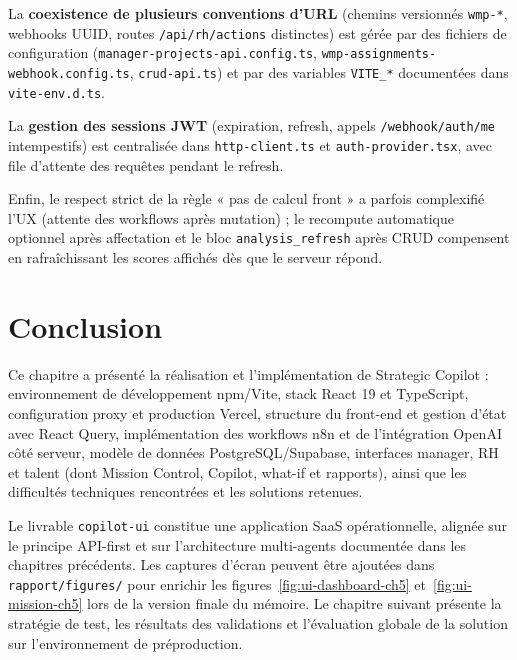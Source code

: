 La \textbf{coexistence de plusieurs conventions d'URL} (chemins versionnés \texttt{wmp-*}, webhooks UUID, routes \texttt{/api/rh/actions} distinctes) est gérée par des fichiers de configuration (\texttt{manager-projects-api.config.ts}, \texttt{wmp-assignments-webhook.config.ts}, \texttt{crud-api.ts}) et par des variables \texttt{VITE\_*} documentées dans \texttt{vite-env.d.ts}.

La \textbf{gestion des sessions JWT} (expiration, refresh, appels \texttt{/webhook/auth/me} intempestifs) est centralisée dans \texttt{http-client.ts} et \texttt{auth-provider.tsx}, avec file d'attente des requêtes pendant le refresh.

Enfin, le respect strict de la règle « pas de calcul front » a parfois complexifié l'UX (attente des workflows après mutation) ; le recompute automatique optionnel après affectation et le bloc \texttt{analysis\_refresh} après CRUD compensent en rafraîchissant les scores affichés dès que le serveur répond.

\section{Conclusion}

Ce chapitre a présenté la réalisation et l'implémentation de Strategic Copilot : environnement de développement npm/Vite, stack React 19 et TypeScript, configuration proxy et production Vercel, structure du front-end et gestion d'état avec React Query, implémentation des workflows n8n et de l'intégration OpenAI côté serveur, modèle de données PostgreSQL/Supabase, interfaces manager, RH et talent (dont Mission Control, Copilot, what-if et rapports), ainsi que les difficultés techniques rencontrées et les solutions retenues.

Le livrable \texttt{copilot-ui} constitue une application SaaS opérationnelle, alignée sur le principe API-first et sur l'architecture multi-agents documentée dans les chapitres précédents. Les captures d'écran peuvent être ajoutées dans \texttt{rapport/figures/} pour enrichir les figures~\ref{fig:ui-dashboard-ch5} et~\ref{fig:ui-mission-ch5} lors de la version finale du mémoire. Le chapitre suivant présente la stratégie de test, les résultats des validations et l'évaluation globale de la solution sur l'environnement de préproduction.
